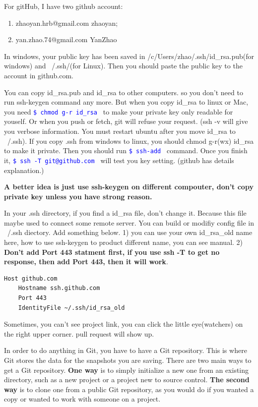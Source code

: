 \documentclass[paper=8.5in:11in, twoside, 12pt, pagesize=pdftex]{book}
\newcommand{\linuxcommand}[1]{\texttt{\textcolor{blue}{\$ #1 \Pisymbol{psy}{191}}}}
\begin{document}
	For gitHub, I have two github account:
	\begin{enumerate}
		\item zhaoyan.hrb@gmail.com  zhaoyan;
		\item yan.zhao.74@gmail.com YanZhao
	\end{enumerate}
	
	In windows, your public key has been saved in /c/Users/zhao/.ssh/id\_rsa.pub(for windows) and ~/.ssh/(for Linux). Then you should paste the public key to the account in github.com.  
	
	You can copy id\_rsa.pub and id\_rsa to other computers. so you don't need to run ssh-keygen command any more. But when you copy id\_rsa to linux or Mac, you need \linuxcommand{chmod g-r id\_rsa} to make your private key only readable for youself. Or when you push or fetch, git will refuse your request.  (ssh -v will give you verbose information. You must restart ubuntu after you move id\_rsa to ~/.ssh). If you copy .ssh from windows to linux, you should chmod g-r(wx) id\_rsa to make it private. Then you should run \linuxcommand{ssh-add} command. Once you finish it, \linuxcommand{ssh -T git@github.com} will test you key setting. (github has details explanation.)
	
	\textbf{A better idea is just use ssh-keygen on different compouter, don't copy private key unless you have strong reason. }
	
	In your .ssh directory, if you find a id\_rsa file, don't change it. Because this file maybe used to connect some remote server. You can build or modifiy config file in ~/.ssh diectory. Add something below. 1) you can use your own id\_rsa\_old name here, how to use ssh-keygen to product different name, you can see manual. 2) \textbf{Don't add Port 443 statment first, if you use ssh -T to get no response, then add Port 443, then it will work}.
\begin{lstlisting}
Host github.com
	Hostname ssh.github.com
	Port 443
	IdentityFile ~/.ssh/id_rsa_old
\end{lstlisting}	
	
	Sometimes, you can't see project link, you can click the little eye(watchers) on the right upper corner. pull request will show up.
	
	In order to do anything in Git, you have to have a Git repository. This is where Git stores the data for the snapshots you are saving. There are two main ways to get a Git repository. \textbf{One way} is to simply initialize a new one from an existing directory, such as a new project or a project new to source control. \textbf{The second way} is to clone one from a public Git repository, as you would do if you wanted a copy or wanted to work with someone on a project.
	
\end{document}
